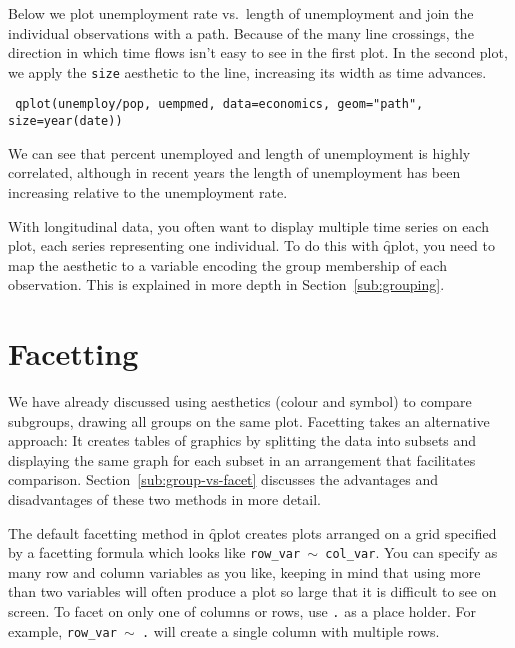 Below we plot unemployment rate vs.\ length of unemployment and join the individual observations with a path.  Because of the many line crossings, the direction in which time flows isn't easy to see in the first plot.  In the second plot, we apply the {\tt size} aesthetic to the line, increasing its width as time advances.

{\tt
qplot(unemploy/pop, uempmed, data=economics, geom="path", size=year(date))
}

We can see that percent unemployed and length of unemployment is highly correlated, although in recent years the length of unemployment has been increasing relative to the unemployment rate.

% 


With longitudinal data, you often want to display multiple time series on each plot, each series representing one individual.  To do this with \f{qplot}, you need to map the  aesthetic to a variable encoding the group membership of each observation. This is explained in more depth in Section~\ref{sub:grouping}.

\section{Facetting}\label{sec:facetting}

We have already discussed using aesthetics (colour and symbol) to compare subgroups, drawing all groups on the same plot. Facetting takes an alternative approach: It creates tables of graphics by splitting the data into subsets and displaying the same graph for each subset in an arrangement that facilitates comparison. Section~\ref{sub:group-vs-facet} discusses the advantages and disadvantages of these two methods in more detail.

The default facetting method in \f{qplot} creates plots arranged on a grid specified by a facetting formula which looks like {\tt row\_var $\sim$ col\_var}.  You can specify as many row and column variables as you like, keeping in mind that using more than two variables will often produce a plot so large that it is difficult to see on screen.  To facet on only one of columns or rows, use {\tt .} as a place holder.  For example, {\tt row\_var $\sim$ .} will create a single column with multiple rows.

